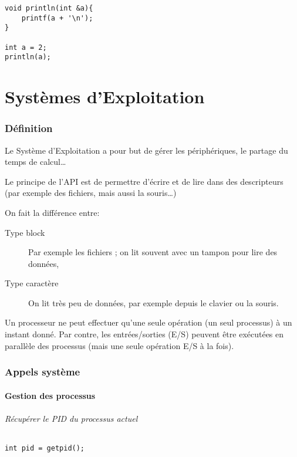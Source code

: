 \documentclass[10pt,a4paper,french]{article}
\begin{document}
\begin{verbatim}
void println(int &a){
    printf(a + '\n');
}

int a = 2;
println(a);
\end{verbatim}

\part{Systèmes d'Exploitation}

\section{Définition}

Le Système d'Exploitation a pour but de gérer les périphériques, le partage du temps de calcul\ldots

Le principe de l'API est de permettre d'écrire et de lire dans des descripteurs (par exemple des fichiers, mais aussi la souris\ldots)

On fait la différence entre:
\begin{description}
\item[Type block] Par exemple les fichiers ; on lit souvent avec un tampon pour lire des données,
\item[Type caractère] On lit très peu de données, par exemple depuis le clavier ou la souris.
\end{description}

Un processeur ne peut effectuer qu'une seule opération (un seul processus) à un instant donné. Par contre, les entrées/sorties (E/S) peuvent être exécutées en parallèle des processus (mais une seule opération E/S à la fois).

\section{Appels système}

\subsection{Gestion des processus}

\paragraph{Récupérer le PID du processus actuel}
\begin{verbatim}
int pid = getpid();
\end{verbatim}
\end{document}
